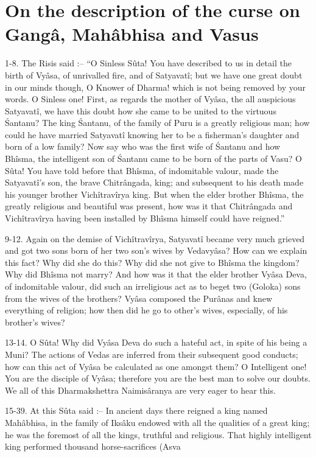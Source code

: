 ﻿\chapter{On the description of the curse on Gang\^a, Mah\^abhisa and Vasus}

1-8. The Risis said :-- ``O Sinless S\^uta! You have described to us in detail the birth of Vy\^asa, of unrivalled fire, and of Satyavat\^i; but we have one great doubt in our minds though, O Knower of Dharma! which is not being removed by your words. O Sinless one! First, as regards the mother of Vy\^asa, the all auspicious Satyavat\^i, we have this doubt how she came to be united to the virtuous \'Santanu? The king \'Santanu, of the family of Puru is a greatly religious man; how could he have married Satyavat\^i knowing her to be a fisherman's daughter and born of a low family? Now say who was the first wife of \'Santanu and how Bh\^isma, the intelligent son of \'Santanu came to be born of the parts of Vasu? O S\^uta! You have told before that Bh\^isma, of indomitable valour, made the Satyavat\^i's son, the brave Chitr\^angada, king; and subsequent to his death made his younger brother Vich\^itrav\^irya king. But when the elder brother Bh\^isma, the greatly religious and beautiful was present, how was it that Chitr\^angada and Vich\^itrav\^irya having been installed by Bh\^isma himself could have reigned.''

9-12. Again on the demise of Vich\^itrav\^irya, Satyavat\^i became very much grieved and got two sons born of her two son's wives by Vedavy\^asa? How can we explain this fact? Why did she do this? Why did she not give to Bh\^isma the kingdom? Why did Bh\^isma not marry? And how was it that the elder brother Vy\^asa Deva, of indomitable valour, did such an irreligious act as to beget two (Goloka) sons from the wives of the brothers? Vy\^asa composed the Pur\^anas and knew everything of religion; how then did he go to other's wives, especially, of his brother's wives?

13-14. O S\^uta! Why did Vy\^asa Deva do such a hateful act, in spite of his being a Muni? The actions of Vedas are inferred from their subsequent good conducts; how can this act of Vy\^asa be calculated as one amongst them? O Intelligent one! You are the disciple of Vy\^asa; therefore you are the best man to solve our doubts. We all of this Dharmakshettra Naimis\^aranya are very eager to hear this.

15-39. At this S\^uta said :-- In ancient days there reigned a king named Mah\^abhisa, in the family of Iks\^aku endowed with all the qualities of a great king; he was the foremost of all the kings, truthful and religious. That highly intelligent king performed thousand horse-sacrifices (Asva

